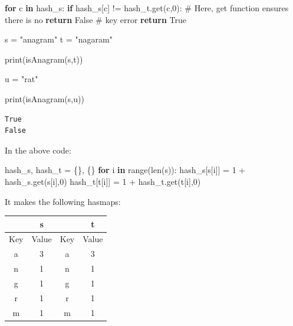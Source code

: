\documentclass[
  letterpaper,
  DIV=11,
  numbers=noendperiod]{scrartcl}
\newenvironment{Shaded}{\begin{snugshade}}{\end{snugshade}}
\newcommand{\BuiltInTok}[1]{\textcolor[rgb]{0.00,0.23,0.31}{#1}}
\newcommand{\CommentTok}[1]{\textcolor[rgb]{0.37,0.37,0.37}{#1}}
\newcommand{\ControlFlowTok}[1]{\textcolor[rgb]{0.00,0.23,0.31}{\textbf{#1}}}
\newcommand{\DecValTok}[1]{\textcolor[rgb]{0.68,0.00,0.00}{#1}}
\newcommand{\KeywordTok}[1]{\textcolor[rgb]{0.00,0.23,0.31}{\textbf{#1}}}
\newcommand{\NormalTok}[1]{\textcolor[rgb]{0.00,0.23,0.31}{#1}}
\newcommand{\OperatorTok}[1]{\textcolor[rgb]{0.37,0.37,0.37}{#1}}
\newcommand{\StringTok}[1]{\textcolor[rgb]{0.13,0.47,0.30}{#1}}
\newcommand{\VariableTok}[1]{\textcolor[rgb]{0.07,0.07,0.07}{#1}}
\newcounter{none} %
\begin{document}
\begin{tcolorbox}[enhanced jigsaw, arc=.35mm, bottomrule=.15mm, breakable, colback=white, colframe=quarto-callout-note-color-frame, left=2mm, leftrule=.75mm, opacityback=0, rightrule=.15mm, toprule=.15mm]
\begin{Shaded}
\begin{Highlighting}[]
  \ControlFlowTok{for}\NormalTok{ c }\KeywordTok{in}\NormalTok{ hash\_s:}
    \ControlFlowTok{if}\NormalTok{ hash\_s[c] }\OperatorTok{!=}\NormalTok{ hash\_t.get(c,}\DecValTok{0}\NormalTok{):       }\CommentTok{\# Here, get function ensures there is no }
      \ControlFlowTok{return} \VariableTok{False}                         \CommentTok{\# key error}
  \ControlFlowTok{return} \VariableTok{True}

\NormalTok{s }\OperatorTok{=} \StringTok{"anagram"}
\NormalTok{t }\OperatorTok{=} \StringTok{"nagaram"}

\BuiltInTok{print}\NormalTok{(isAnagram(s,t))}

\NormalTok{u }\OperatorTok{=} \StringTok{"rat"}

\BuiltInTok{print}\NormalTok{(isAnagram(s,u))}
\end{Highlighting}
\end{Shaded}

\begin{verbatim}
True
False
\end{verbatim}

In the above code:

\begin{Shaded}
\begin{Highlighting}[]
\NormalTok{hash\_s, hash\_t }\OperatorTok{=}\NormalTok{ \{\}, \{\}}
  \ControlFlowTok{for}\NormalTok{ i }\KeywordTok{in} \BuiltInTok{range}\NormalTok{(}\BuiltInTok{len}\NormalTok{(s)):}
\NormalTok{    hash\_s[s[i]] }\OperatorTok{=} \DecValTok{1} \OperatorTok{+}\NormalTok{ hash\_s.get(s[i],}\DecValTok{0}\NormalTok{)  }
\NormalTok{    hash\_t[t[i]] }\OperatorTok{=} \DecValTok{1} \OperatorTok{+}\NormalTok{ hash\_t.get(t[i],}\DecValTok{0}\NormalTok{)  }
\end{Highlighting}
\end{Shaded}

It makes the following hasmaps:

{\def\LTcaptype{none} %
\begin{longtable}[]{@{}cccc@{}}
\toprule\noalign{}
& s & & t \\
\midrule\noalign{}
\endhead
\bottomrule\noalign{}
\endlastfoot
Key & Value & Key & Value \\
a & 3 & a & 3 \\
n & 1 & n & 1 \\
g & 1 & g & 1 \\
r & 1 & r & 1 \\
m & 1 & m & 1 \\
\end{longtable}
}


\end{tcolorbox}
\end{document}
